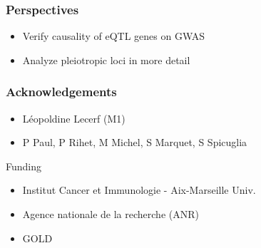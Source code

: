 \documentclass{beamer}
\newcommand*{\floatRelativePath}{../out/gwas417/pval_5e-08/r2_0.1/kb_1000/window_1000000/75_50}%
\begin{document}
    \begin{frame}
        \frametitle{Perspectives}

        \begin{itemize}
            \item Verify causality of eQTL genes on GWAS
            \item Analyze pleiotropic loci in more detail
        \end{itemize}

    \end{frame}

    \begin{frame}
        \frametitle{Acknowledgements}

        \begin{itemize}
            \item L\'eopoldine Lecerf (M1)
            \item P Paul, P Rihet, M Michel, S Marquet, S Spicuglia
        \end{itemize}
%
        \vfill
%
        Funding
%
        \begin{itemize}
            \item Institut Cancer et Immunologie - Aix-Marseille Univ.
            \item Agence nationale de la recherche (ANR)
            \item GOLD
        \end{itemize}

    \end{frame}

    \begin{frame}
        \frametitle{}

    \end{frame}

%
%
\end{document}
